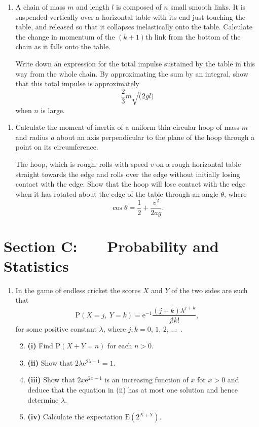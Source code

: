 \documentclass[a4, 11pt]{report}
\newlength{\qspace}
\newcounter{qnumber}
\newenvironment{question}%
 {\vspace{\qspace}
  \begin{enumerate}[\bfseries 1\quad][10]%
    \setcounter{enumi}{\value{qnumber}}%
    \item%
 }
{
  \end{enumerate}
  \filbreak
  \stepcounter{qnumber}
 }
\newenvironment{questionparts}[1][1]%
 {
  \begin{enumerate}[\bfseries (i)]%
    \setcounter{enumii}{#1}
    \addtocounter{enumii}{-1}
    \setlength{\itemsep}{5mm}
    \setlength{\parskip}{8pt}
 }
 {
  \end{enumerate}
 }
\def\e{{\mathrm e}}
\def\E{{\mathrm E}}
\def\P{{\mathrm P}}
\begin{document}
\begin{question}	
A chain of mass $m$ and length $l$ is composed of $n$ small smooth  links.
It is suspended vertically over a horizontal table with
its end just touching the table, and released so that it
collapses inelastically onto the table.
Calculate the change in momentum of the $(k+1)$th link from the bottom
of the chain as it
falls onto the table.

Write down an expression for the total impulse sustained by the table 
in this way from  the whole chain. By approximating the
sum by an integral, show that 
this  
total impulse  is approximately 
\[
{\textstyle \frac23} m \surd(2gl)
\]
when $n$ is large.


\end{question}


\begin{question}
Calculate the moment of inertia of a 
uniform thin
 circular hoop of mass $m$ and radius $a$ about an axis perpendicular to the 
plane of the hoop through a point on its circumference.

The hoop, which is rough,  
rolls with speed $v$ on a rough  horizontal
table straight towards the edge and rolls over the edge without initially 
losing contact with the edge. Show that the hoop will lose contact with
the edge when it has rotated about the edge of the table
through an angle $\theta$, where
\[
\cos\theta = \frac 12 +\frac {v^2}{2ag}.
\]

\end{question}
	

	
	\newpage
\section*{Section C: \ \ \ Probability and Statistics}


\begin{question}
In the game of endless cricket the scores
$X$ and $Y$ of the two sides are such that 
\[
\P (X=j,\ Y=k)=\e^{-1}\frac{(j+k)\lambda^{j+k}}{j!k!},\]
for some positive constant $\lambda$, where $j,k = 0$, $1$, $2$, $\ldots$\ .
\begin{questionparts}
\item[\bf(i)] Find $\P(X+Y=n)$ for each $n>0$.

\item[\bf(ii)] Show that $2\lambda \e^{2\lambda-1}=1$.

\item[\bf(iii)] Show that $2x \e^{2x-1}$ is an increasing function
of $x$ for $x>0$ and deduce that the equation in (ii) has
at most one solution and hence determine $\lambda$.

\item[\bf(iv)] Calculate the expectation $\E(2^{X+Y})$.
\end{questionparts}

\end{question}
\end{document}
